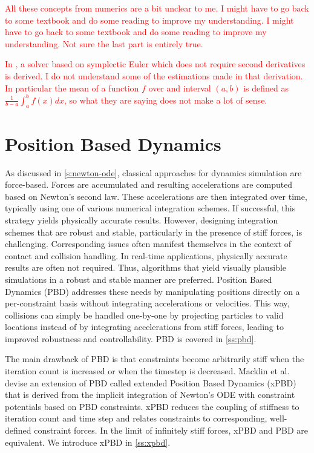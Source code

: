 \textcolor{red}{
    All these concepts from numerics are a bit unclear to me. I might have to go back to some textbook and do some reading to improve my understanding. 
    I might have to go back to some textbook and do some reading to improve my understanding. Not sure the last part is entirely true.}

\textcolor{red}{
    In \cite{servin2006}, a solver based on symplectic Euler which does not require second derivatives is derived. I do not understand some of the
    estimations made in that derivation. In particular the mean of a function $f$ over and interval $(a, b)$ is defined as $\frac{1}{b-a}
    \int_a^b f(x) dx$, so what they are saying does not make a lot of sense.}

\section{Position Based Dynamics}\label{s:pbd}
As discussed in \cref{s:newton-ode}, classical approaches for dynamics simulation are force-based. Forces are accumulated and resulting accelerations
are computed based on Newton's second law. These accelerations are then integrated over time, typically using one of various numerical integration
schemes. If successful, this strategy yields physically accurate results. However, designing integration schemes that are robust and stable,
particularly in the presence of stiff forces, is challenging. Corresponding issues often manifest themselves in the context of contact and collision 
handling. In real-time applications, physically accurate results are often not required. Thus, algorithms that yield visually
plausible simulations in a robust and stable manner are preferred. Position Based Dynamics (PBD) \cite{mueller2006} addresses these needs by 
manipulating positions directly on a per-constraint basis without integrating accelerations or velocities. This way, collisions can simply be handled 
one-by-one by projecting particles to valid locations instead of by integrating accelerations from stiff forces, leading to improved robustness and 
controllability. PBD is covered in \cref{ss:pbd}.

The main drawback of PBD is that constraints become arbitrarily stiff when the iteration count is increased or when the timestep is decreased.
Macklin et al.\ \cite{macklin2016} devise an extension of PBD called extended Position Based Dynamics (xPBD) that is derived from the implicit
integration of Newton's ODE with constraint potentials based on PBD constraints. xPBD reduces the coupling of stiffness to iteration count
and time step and relates constraints to corresponding, well-defined constraint forces. In the limit of infinitely stiff forces, xPBD and PBD are
equivalent. We introduce xPBD in \cref{ss:xpbd}.

